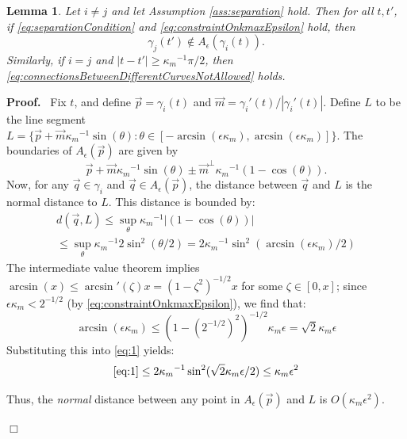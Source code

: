 \documentclass{article}
\newcommand{\nin}{\not\in}
\newenvironment{proof}{
  \noindent\textbf{Proof.}\ }{\hspace*{\fill}
  \begin{math}\Box\end{math}\medskip}
\newtheorem{lemma}[cntr]{Lemma}
\numberwithin{cntr}{section}
\numberwithin{equation}{section}
\newcommand{\abs}[1]{\left| #1 \right|}%
\newcommand{\vp}[0]{{\vec{p}}}
\newcommand{\vq}[0]{{\vec{q}}}
\newcommand{\vm}[0]{{\vec{m}}}
\newcommand{\allowed}[2]{ { A_{#1}(#2) } }
\newcommand{\curvemax}{{\kappa_{m}}}
\newcommand{\curvemaxi}{{\curvemax^{-1}}}
\begin{document}
\begin{lemma}
  \label{lem:separationAllowedRegions}
  Let $i \neq j$ and let Assumption \ref{ass:separation} hold. Then for all $t, t'$, if \eqref{eq:separationCondition} and \eqref{eq:constraintOnkmaxEpsilon} hold, then
  \begin{equation}
    \label{eq:connectionsBetweenDifferentCurvesNotAllowed}
    \gamma_{j}(t')  \nin  \allowed{\epsilon}{\gamma_{i}(t)}.
  \end{equation}
  Similarly, if $i=j$ and $\abs{t-t'} \geq \curvemax^{-1} \pi/2$, then \eqref{eq:connectionsBetweenDifferentCurvesNotAllowed} holds.
\end{lemma}
\begin{proof}
  Fix $t$, and define $\vp=\gamma_{i}(t)$ and $\vm=\gamma_{i}'(t) / \abs{\gamma_{i}'(t)}$. Define $L$ to be the line segment $L= \{ \vp+\vm \curvemaxi \sin(\theta) : \theta \in [-\arcsin(\epsilon \curvemax),\arcsin(\epsilon \curvemax)] \}$. The boundaries of $\allowed{\epsilon}{\vp}$ are given by
\begin{equation*}
  \vp + \vm \curvemaxi \sin(\theta) \pm \vm^{\perp} \curvemaxi (1-\cos(\theta)).
\end{equation*}
Now, for any $\vq \in \gamma_{i} $ and $\vq \in \allowed{\epsilon}{\vp}$, the distance between $\vq$ and $L$ is the normal distance to $L$. This distance is bounded by:
\begin{multline}
  \label{eq:1}
  d(\vq,L) \leq
  \sup_{\theta} \curvemaxi \abs{(1-\cos(\theta)) }\\
  \leq
  \sup_{\theta} \curvemaxi 2 \sin^{2}(\theta/2) =
  2\curvemaxi \sin^{2}( \arcsin(\epsilon \curvemax)/2)
\end{multline}
The intermediate value theorem implies $\arcsin( x) \leq \arcsin'(\zeta) x=(1-\zeta^{2})^{-1/2} x$ for some $\zeta \in [0,x]$; since $\epsilon \curvemax < 2^{-1/2}$ (by \eqref{eq:constraintOnkmaxEpsilon}), we find that:
\begin{equation*}
  \arcsin(\epsilon \curvemax) \leq (1-(2^{-1/2})^{2})^{-1/2} \curvemax \epsilon = \sqrt{2} \curvemax \epsilon
\end{equation*}
Substituting this into \eqref{eq:1} yields:
\begin{equation}
  \eqref{eq:1} \leq  2 \curvemaxi \sin^{2}( \sqrt{2} \curvemax \epsilon/2) \leq \curvemax \epsilon^{2}
\end{equation}

Thus, the \emph{normal} distance between any point in $\allowed{\epsilon}{\vp}$ and $L$ is $O(\curvemax \epsilon^{2})$.


\end{proof}
\end{document}
